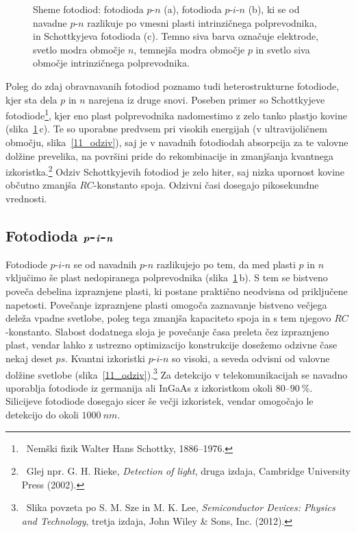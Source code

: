 \begin{figure}[ht]
\centering
\def\svgwidth{140truemm} 

\caption{Sheme fotodiod: fotodioda $p$-$n$ (a), fotodioda $p$-$i$-$n$ (b),  ki se od 
navadne $p$-$n$ razlikuje po vmesni plasti intrinzičnega
polprevodnika, in Schottkyjeva fotodioda (c). 
Temno siva barva označuje elektrode, svetlo modra območje $n$, 
temnejša modra območje $p$ in svetlo siva območje intrinzičnega polprevodnika. }
\label{11_shema}
\end{figure}
\begin{remark}
Poleg do zdaj obravnavanih fotodiod poznamo tudi heterostrukturne 
fotodiode, kjer sta dela $p$ in $n$ 
narejena iz druge snovi. Poseben primer so Schottkyjeve fotodiode\footnote{~Nemški fizik
Walter Hans Schottky, 1886--1976.}, kjer eno plast polprevodnika
nadomestimo z zelo tanko plastjo kovine (slika~\ref{11_shema}\,c). Te so uporabne predvsem pri 
visokih energijah (v ultravijoličnem območju, slika~\ref{11_odziv}), 
saj je v navadnih fotodiodah absorpcija za te valovne dolžine prevelika, na površini pride do 
rekombinacije in zmanjšanja kvantnega izkoristka.\footnote{~Glej npr. G. H. Rieke, {\it Detection 
of light}, druga izdaja, Cambridge University Press (2002).}  
Odziv Schottkyjevih fotodiod je zelo hiter, 
saj nizka upornost kovine občutno zmanjša $RC$-konstanto spoja. Odzivni časi 
dosegajo pikosekundne vrednosti.
\end{remark}

\subsection*{Fotodioda $\textbf{\textit{p}}$-$\textbf{\textit{i}}$-$\textbf{\textit{n}}$}
Fotodiode $p$-$i$-$n$ se od navadnih $p$-$n$ razlikujejo po tem, da med plasti $p$ in $n$ 
vključimo še plast nedopiranega polprevodnika (slika~\ref{11_shema}\,b). 
S tem se bistveno poveča debelina
izpraznjene plasti, ki postane praktično neodvisna od priključene napetosti.
Povečanje izpraznjene plasti omogoča zaznavanje bistveno večjega deleža vpadne svetlobe, 
poleg tega zmanjša kapaciteto spoja in s tem njegovo $RC$-konstanto. Slabost dodatnega
sloja je povečanje časa preleta čez izpraznjeno plast, vendar lahko
z ustrezno optimizacijo konstrukcije dosežemo odzivne čase nekaj deset $\si{ps}$.
Kvantni izkoristki $p$-$i$-$n$ so visoki, a seveda odvisni od valovne dolžine svetlobe
(slika~\ref{11_odziv}).\footnote{~Slika povzeta po S. M. Sze in M. K. Lee, {\it Semiconductor Devices: Physics and Technology}, tretja izdaja, John Wiley \& Sons, Inc. (2012).} Za detekcijo
v telekomunikacijah se navadno uporablja fotodiode iz germanija ali InGaAs z izkoristkom
okoli $80$--$90~\%$. Silicijeve fotodiode dosegajo sicer še večji izkoristek, vendar omogočajo
le detekcijo do okoli $1000~\si{nm}$.

